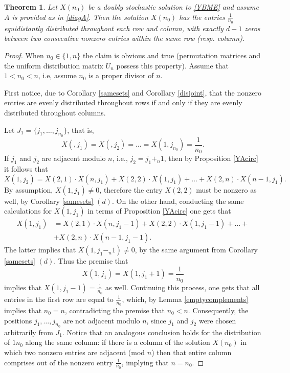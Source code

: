 \documentclass{article}
\newtheorem{theorem}{Theorem}[section]
\theoremstyle{definition}\newtheorem{example}{Example}[section]
\begin{document}
	\begin{theorem}\label{equidistant} Let $X(n_0)$ be a doubly stochastic solution to \eqref{YBME} and assume $A$ is provided as in \eqref{diagA}. Then the solution $X(n_0)$ has the entries $\frac{1}{n_0}$ equidistantly distributed throughout each row and column, with exactly $d-1$ zeros between two consecutive nonzero entries within the same row (resp. column).
	\end{theorem}
	\begin{proof} When $n_0\in\{1,n\}$ the claim is obvious and true (permutation matrices and the uniform distribution matrix $U_n$ possess this property). Assume that $1<n_0<n$, i.e, assume $n_0$ is a proper divisor of $n$.
		
		First notice, due to Corollary \ref{samesets} and Corollary \ref{disjoint}, that the nonzero entries are evenly distributed throughout rows if and only if they are evenly distributed throughout columns.  
		
		Let $J_1=\{j_1,\ldots, j_{n_0}\}$,  that is, $$X(,j_1)=X(,j_2)=\ldots=X(1,j_{n_0})=\frac{1}{n_0}.$$  
		If  $j_1$ and $j_2$ are adjacent modulo $n$, i.e., $j_2=j_1+_n1$, then by Proposition \ref{YAcirc} it follows that
		$$X(1,j_2)=X(2,1)\cdot X(n,j_1)+X(2,2)\cdot X(1,j_1)+\ldots+X(2,n)\cdot X(n-1,j_1).$$
		By assumption, $X(1,j_1)\neq0$, therefore the entry $X(2,2)$ must be nonzero as well, by Corollary \ref{samesets} $(d)$. On the other hand, conducting the same calculations for $X(1,j_1)$ in terms of Proposition \ref{YAcirc} one gets that
		$$\begin{aligned}
			X(1,j_1)&=X(2,1)\cdot X(n,j_1-1)+X(2,2)\cdot X(1,j_1-1)+\ldots+\\
			&+X(2,n)\cdot X(n-1,j_1-1).\end{aligned}$$
		The latter implies that $X(1,j_1-_n1)\neq0$, by the same argument from Corollary \ref{samesets} $(d)$.  Thus the premise that $$X(1,j_1)=X(1,j_1+1)=\frac{1}{n_0}$$ 
		implies that $X(1,j_1-1)=\frac{1}{n_0}$ as well. Continuing this process, one gets that all entries in the first row are equal to $\frac{1}{n_0}$, which, by  Lemma \ref {emptycomplements} implies that $n_0=n$, contradicting the premise that $n_0<n$. Consequently, the positions  $j_1,\ldots,j_{n_0}$ are not adjacent modulo $n$, since $j_1$ and $j_2$ were chosen arbitrarily from $J_1$. Notice that an analogous conclusion holds for the distribution of ${1}{n_0}$ along the same column: if there is a column of the solution $X(n_0)$ in which two nonzero entries are adjacent (mod $n$) then that entire column comprises out of the nonzero entry $\frac{1}{n_0}$, implying that $n=n_0$. 
		

\end{proof}
\end{document}
